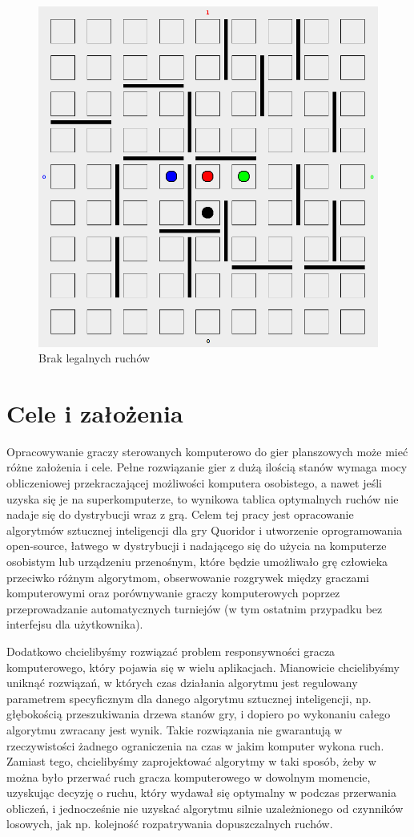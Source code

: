 \documentclass{pracamgr}
\begin{document}
\begin{figure}[ht!]
\centering
\includegraphics[width=120mm]{img/no-move.png}
\caption{Brak legalnych ruchów \label{overflow}}
\end{figure}

\section{Cele i założenia}

Opracowywanie graczy sterowanych komputerowo do gier planszowych może mieć różne założenia i cele. Pełne rozwiązanie gier z dużą ilością stanów wymaga mocy obliczeniowej przekraczającej możliwości komputera osobistego, a nawet jeśli uzyska się je na superkomputerze, to wynikowa tablica optymalnych ruchów nie nadaje się do dystrybucji wraz z grą. Celem tej pracy jest opracowanie algorytmów sztucznej inteligencji dla gry Quoridor i utworzenie oprogramowania open-source, łatwego w dystrybucji i nadającego się do użycia na komputerze osobistym lub urządzeniu przenośnym, które będzie umożliwało grę człowieka przeciwko różnym algorytmom, obserwowanie rozgrywek między graczami komputerowymi oraz porównywanie graczy komputerowych poprzez przeprowadzanie automatycznych turniejów (w tym ostatnim przypadku bez interfejsu dla użytkownika).

Dodatkowo chcielibyśmy rozwiązać problem responsywności gracza komputerowego, który pojawia się w wielu aplikacjach. Mianowicie chcielibyśmy uniknąć rozwiązań, w których czas działania algorytmu jest regulowany parametrem specyficznym dla danego algorytmu sztucznej inteligencji, np. głębokością przeszukiwania drzewa stanów gry, i dopiero po wykonaniu całego algorytmu zwracany jest wynik. Takie rozwiązania nie gwarantują w rzeczywistości żadnego ograniczenia na czas w jakim komputer wykona ruch. Zamiast tego, chcielibyśmy zaprojektować algorytmy w taki sposób, żeby w można było przerwać ruch gracza komputerowego w dowolnym momencie, uzyskując decyzję o ruchu, który wydawał się optymalny w podczas przerwania obliczeń, i jednocześnie nie uzyskać algorytmu silnie uzależnionego od czynników losowych, jak np. kolejność rozpatrywania dopuszczalnych ruchów.
\end{document}
